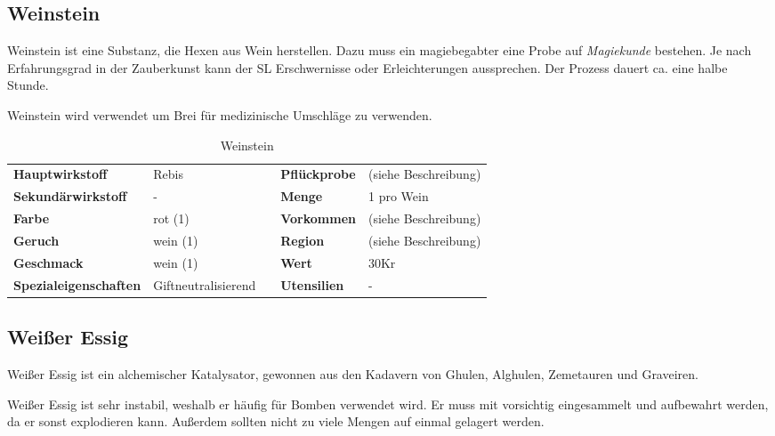 \subsection{Weinstein}
Weinstein ist eine Substanz, die Hexen aus Wein herstellen. Dazu muss ein magiebegabter eine Probe auf \textit{Magiekunde} bestehen. Je nach Erfahrungsgrad in der Zauberkunst kann der SL Erschwernisse oder Erleichterungen aussprechen. Der Prozess dauert ca. eine halbe Stunde.

Weinstein wird verwendet um Brei für medizinische Umschläge zu verwenden.

\begin{table}[H] 
\begin{center} 
\begin{tabular}{|l|l|p{1cm}|l|l|} 
  	\cline{1-2} \cline{4-5} 
  	\textbf{Hauptwirkstoff} & Rebis && \textbf{Pflückprobe} & (siehe Beschreibung) \\ \cline{1-2} \cline{4-5} 
  	\textbf{Sekundärwirkstoff} & - && \textbf{Menge} & 1 pro Wein \\ \cline{1-2} \cline{4-5} 
  	\textbf{Farbe} & rot (1) && \textbf{Vorkommen} & (siehe Beschreibung) \\ \cline{1-2} \cline{4-5} 
  	\textbf{Geruch} & wein (1) && \textbf{Region} & (siehe Beschreibung) \\ \cline{1-2} \cline{4-5} 
  	\textbf{Geschmack} & wein (1) && \textbf{Wert} & 30Kr \\ \cline{1-2} \cline{4-5} 
  	\textbf{Spezialeigenschaften} & Giftneutralisierend && \textbf{Utensilien} & - \\ \cline{1-2} \cline{4-5} 
\end{tabular} 
\end{center} 
\caption{Weinstein} 
\label{tab:weinstein} 
\end{table}


\subsection{Weißer Essig}
Weißer Essig ist ein alchemischer Katalysator, gewonnen aus den Kadavern von Ghulen, Alghulen, Zemetauren und Graveiren. 

Weißer Essig ist sehr instabil, weshalb er häufig für Bomben verwendet wird. Er muss mit vorsichtig eingesammelt und aufbewahrt werden, da er sonst explodieren kann. Außerdem sollten nicht zu viele Mengen auf einmal gelagert werden.


